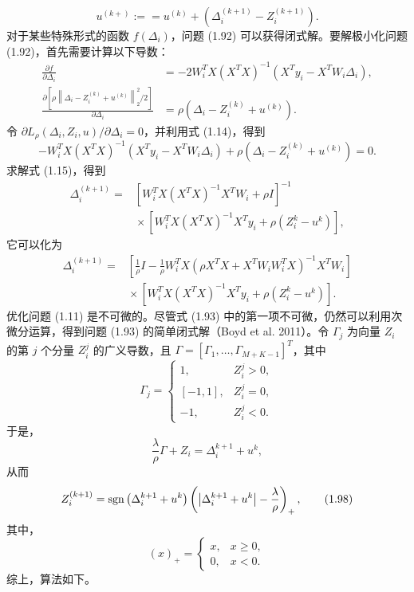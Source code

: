 \begin{equation}
 u^{(k+)}\mathrel{:==}u^{(k)}
       +\left(\Delta_i^{(k+1)}-Z_i^{(k+1)}\right).
 \tag{1.94}
\end{equation}
对于某些特殊形式的函数 $f(\Delta_i)$，问题 (1.92) 可以获得闭式解。要解极小化问题 (1.92)，首先需要计算以下导数：
\begin{equation}
 \begin{aligned}
 \frac{\partial f}{\partial\Delta_i}
 &=-2W_i^{T}X(X^{T}X)^{-1}(X^{T}y_i-X^{T}W_i\Delta_i),\\
 \frac{\partial\left[
       \rho\left\lVert\Delta_i-Z_i^{(k)}+u^{(k)}\right\rVert_2^2/2
       \right]}{\partial\Delta_i}
 &=\rho\left(\Delta_i-Z_i^{(k)}+u^{(k)}\right).
 \end{aligned}
 \tag{1.95}
\end{equation}
令 $\partial L_\rho(\Delta_i,Z_i,u)/\partial\Delta_i=0$，并利用式 (1.14)，得到
\begin{equation}
 -W_i^{T}X(X^{T}X)^{-1}(X^{T}y_i-X^{T}W_i\Delta_i)
 +\rho\left(\Delta_i-Z_i^{(k)}+u^{(k)}\right)=0.
 \tag{1.96}
\end{equation}
求解式 (1.15)，得到
\begin{equation}
 \begin{aligned}
 \Delta_i^{(k+1)}
 ={}&\left[W_i^{T}X(X^{T}X)^{-1}X^{T}W_i+\rho I\right]^{-1}\\
 &{}\times\left[W_i^{T}X(X^{T}X)^{-1}X^{T}y_i
                          +\rho\left(Z_i^k-u^k\right)\right],
 \end{aligned}
 \tag{1.97}
\end{equation}
它可以化为
\[
 \begin{aligned}
 \Delta_i^{(k+1)}
 ={}&\left[\frac1\rho I-\frac1\rho W_i^{T}X
         \left(\rho X^{T}X+X^{T}W_iW_i^{T}X\right)^{-1}X^{T}W_i\right]\\
 &{}\times\left[W_i^{T}X(X^{T}X)^{-1}X^{T}y_i
                        +\rho\left(Z_i^k-u^k\right)\right].
 \end{aligned}
\]
优化问题 (1.11) 是不可微的。尽管式 (1.93) 中的第一项不可微，仍然可以利用次微分运算，得到问题 (1.93) 的简单闭式解（Boyd et al. 2011）。令 $\Gamma_j$ 为向量 $Z_i$ 的第 $j$ 个分量 $Z_i^j$ 的广义导数，且 $\Gamma=[\Gamma_1,\ldots,\Gamma_{M+K-1}]^{T}$，其中
\[
 \Gamma_j=
 \begin{cases}
  1,&Z_i^j>0,\\
  [-1,1],&Z_i^j=0,\\
  -1,&Z_i^j<0.
 \end{cases}
\]
于是，
\[
 \frac\lambda\rho\Gamma+Z_i=\Delta_i^{k+1}+u^k,
\]
从而
\begin{equation}
 Z_i^{(k+1)}
 =\operatorname{sgn}\left(\Delta_i^{k+1}+u^k\right)
    \left(\left|\Delta_i^{k+1}+u^k\right|-\frac\lambda\rho\right)_+,
 \tag{1.98}
\end{equation}
其中，
\[
 (x)_+=
 \begin{cases}
  x,&x\geq0,\\
  0,&x<0.
 \end{cases}
\]
综上，算法如下。

